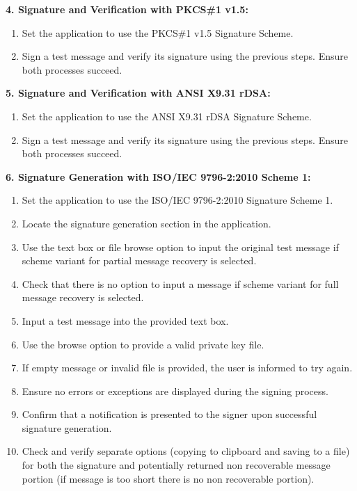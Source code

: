 \documentclass[]{final_report}
\theoremstyle{definition}
\begin{document}
\textbf{4. Signature and Verification with PKCS\#1 v1.5:}
\begin{enumerate}
\item Set the application to use the PKCS\#1 v1.5 Signature Scheme.
\item Sign a test message and verify its signature using the previous steps. Ensure both processes succeed.
\end{enumerate}

\textbf{5. Signature and Verification with ANSI X9.31 rDSA:}
\begin{enumerate}
\item Set the application to use the ANSI X9.31 rDSA Signature Scheme.
\item Sign a test message and verify its signature using the previous steps. Ensure both processes succeed.
\end{enumerate}

\textbf{6. Signature Generation with ISO/IEC 9796-2:2010 Scheme 1:}
\begin{enumerate}
\item Set the application to use the ISO/IEC 9796-2:2010 Signature Scheme 1.
\item Locate the signature generation section in the application.
\item Use the text box or file browse option to input the original test message if scheme variant for partial message recovery is selected.
\item Check that there is no option to input a message if scheme variant for full message recovery is selected.
\item Input a test message into the provided text box. 
\item Use the browse option to provide a valid private key file.
\item If empty message or invalid file is provided, the user is informed to try again. 
\item Ensure no errors or exceptions are displayed during the signing process.
\item Confirm that a notification is presented to the signer upon successful signature generation.
\item Check and verify separate options (copying to clipboard and saving to a file) for both the signature and potentially returned non recoverable message portion (if message is too short there is no non recoverable portion).
\end{enumerate}
\end{document}
